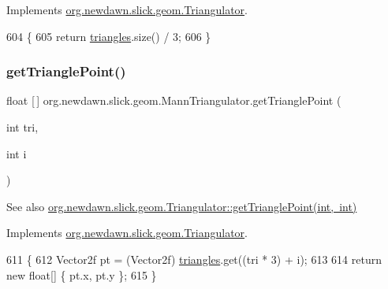 Implements \mbox{\hyperlink{interfaceorg_1_1newdawn_1_1slick_1_1geom_1_1_triangulator_a7a5d68a694f2b80878c48563b5ea6f1f}{org.\+newdawn.\+slick.\+geom.\+Triangulator}}.


\begin{DoxyCode}
604                                   \{
605         \textcolor{keywordflow}{return} \mbox{\hyperlink{classorg_1_1newdawn_1_1slick_1_1geom_1_1_mann_triangulator_ad0c6e5e26a0a15154513f0225f156c7a}{triangles}}.size() / 3;
606     \}
\end{DoxyCode}
\mbox{\label{classorg_1_1newdawn_1_1slick_1_1geom_1_1_mann_triangulator_a59edd6ad99b277cfe7bf33e466eea504}} 
\subsubsection{\texorpdfstring{get\+Triangle\+Point()}{getTrianglePoint()}}
{\footnotesize\ttfamily float \mbox{[}$\,$\mbox{]} org.\+newdawn.\+slick.\+geom.\+Mann\+Triangulator.\+get\+Triangle\+Point (\begin{DoxyParamCaption}\item[{int}]{tri,  }\item[{int}]{i }\end{DoxyParamCaption})\hspace{0.3cm}{\ttfamily [inline]}}

\begin{DoxySeeAlso}{See also}
\mbox{\hyperlink{interfaceorg_1_1newdawn_1_1slick_1_1geom_1_1_triangulator_a0142ec1a5f11292813f0f4e9a1407efb}{org.\+newdawn.\+slick.\+geom.\+Triangulator\+::get\+Triangle\+Point(int, int)}} 
\end{DoxySeeAlso}


Implements \mbox{\hyperlink{interfaceorg_1_1newdawn_1_1slick_1_1geom_1_1_triangulator_a0142ec1a5f11292813f0f4e9a1407efb}{org.\+newdawn.\+slick.\+geom.\+Triangulator}}.


\begin{DoxyCode}
611                                                     \{
612         Vector2f pt = (Vector2f) \mbox{\hyperlink{classorg_1_1newdawn_1_1slick_1_1geom_1_1_mann_triangulator_ad0c6e5e26a0a15154513f0225f156c7a}{triangles}}.get((tri * 3) + i);
613 
614         \textcolor{keywordflow}{return} \textcolor{keyword}{new} \textcolor{keywordtype}{float}[] \{ pt.x, pt.y \};
615     \}
\end{DoxyCode}
\mbox{\label{classorg_1_1newdawn_1_1slick_1_1geom_1_1_mann_triangulator_a450e5335641bda3d144b0fe4ff8ca499}} 
